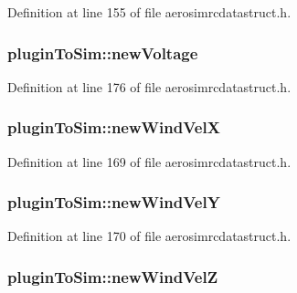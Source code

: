 Definition at line 155 of file aerosimrcdatastruct.\-h.

\hypertarget{group___aero_sim_r_c_ga6a11d71df14bc0a5867c993a47da8f0f}{
\subsubsection[{new\-Voltage}]{ plugin\-To\-Sim\-::new\-Voltage}}\label{group___aero_sim_r_c_ga6a11d71df14bc0a5867c993a47da8f0f}


Definition at line 176 of file aerosimrcdatastruct.\-h.

\hypertarget{group___aero_sim_r_c_ga894c4529647383039436d227ab09ea6d}{
\subsubsection[{new\-Wind\-Vel\-X}]{ plugin\-To\-Sim\-::new\-Wind\-Vel\-X}}\label{group___aero_sim_r_c_ga894c4529647383039436d227ab09ea6d}


Definition at line 169 of file aerosimrcdatastruct.\-h.

\hypertarget{group___aero_sim_r_c_gaf7648b2c6048cddf0ba9fb68dfb55492}{
\subsubsection[{new\-Wind\-Vel\-Y}]{ plugin\-To\-Sim\-::new\-Wind\-Vel\-Y}}\label{group___aero_sim_r_c_gaf7648b2c6048cddf0ba9fb68dfb55492}


Definition at line 170 of file aerosimrcdatastruct.\-h.

\hypertarget{group___aero_sim_r_c_gaa84a637360a4648e08d41632fb8f38c0}{
\subsubsection[{new\-Wind\-Vel\-Z}]{ plugin\-To\-Sim\-::new\-Wind\-Vel\-Z}}\label{group___aero_sim_r_c_gaa84a637360a4648e08d41632fb8f38c0}



